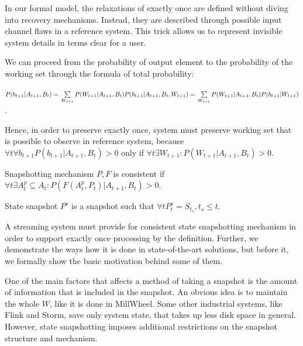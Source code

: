 In our formal model, the relaxations of exactly once are defined without diving into recovery mechanisms. Instead, they are described through possible input channel flaws in a reference system. This trick allows us to represent invisible system details in terms clear for a user.

We can proceed from the probability of output element to the probability of the working set through the formula of total probability:

$P(b_{t+1}|A_{t+1},B_t)=\\
\sum\limits_{W_{t+1}}P(W_{t+1}|A_{t+1},B_t)P(b_{t+1}|A_{t+1},B_t,W_{t+1})=\\
\sum\limits_{W_{t+1}}P(W_{t+1}|A_{t+1},B_t)P(b_{t+1}|W_{t+1})
$.

Hence, in order to preserve exactly once, system must preserve working set that is possible to observe in reference system, because $\forall{t} \forall{b_{t+1}} P(b_{t+1}|A_{t+1},B_t)>0$ only if $\forall{t} \exists{W_{t+1}}:P(W_{t+1}|A_{t+1},B_t)>0$.

\begin{definition}{Snapshotting mechanism $P,F$ is consistent}
if $\forall{t} \exists{A^{p}_t\subseteq{A_t}} : P(F(A^{p}_t,P_t)|A_{t+1},B_t)>0$.
\end{definition}


\begin{definition}{State snapshot}
$P^{s}$ is a snapshot such that $\forall{t} P^{s}_t = S_{t_s},t_s \leq t$.
\end{definition}

A streaming system must provide for consistent state snapshotting mechanism in order to support exactly once processing by the definition. Further, we demonstrate the ways how it is done in state-of-the-art solutions, but before it, we formally show the basic motivation behind some of them. 

One of the main factors that affects a method of taking a snapshot is the amount of information that is included in the snapshot. An obvious idea is to maintain the whole $W$, like it is done in MillWheel. Some other industrial systems, like Flink and Storm, save only system state, that takes up less disk space in general. However, state snapshotting imposes additional restrictions on the snapshot structure and mechanism.

